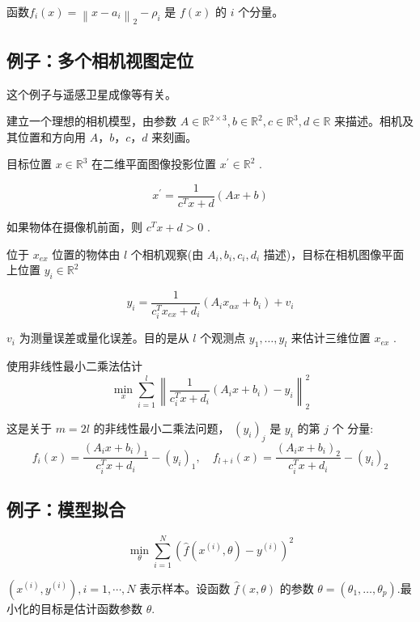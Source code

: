 函数$ f_{i}(x)=\left\|x-a_{i}\right\|_{2}-\rho_{i} $ 是 $ f(x) $ 的 $ i $ 个分量。


\subsection{例子：多个相机视图定位}

\begin{remark}
    这个例子与遥感卫星成像等有关。
\end{remark}

建立一个理想的相机模型，由参数 $ A \in \mathbb{R}^{2 \times 3}, b \in \mathbb{R}^{2}, c \in \mathbb{R}^{3}, d \in \mathbb{R} $ 来描述。相机及其位置和方向用 $ A ， b ， c ， d $ 来刻画。

目标位置 $ x \in \mathbb{R}^{3} $ 在二维平面图像投影位置 $ x^{\prime} \in \mathbb{R}^{2} $ .

$$
x^{\prime}=\frac{1}{c^{T} x+d}(A x+b)
$$

如果物体在摄像机前面，则 $ c^{T} x+d>0 $ .

\begin{problem}
    位于 $ x_{e x} $ 位置的物体由 $ l $ 个相机观察(由 $ A_{i}, b_{i}, c_{i}, d_{i} $ 描述)，目标在相机图像平面上位置 $ y_{i} \in \mathbb{R}^{2} $

    $$
    y_{i}=\frac{1}{c_{i}^{T} x_{e x}+d_{i}}\left(A_{i} x_{\alpha x}+b_{i}\right)+v_{i}
    $$

    $ v_{i} $ 为测量误差或量化误差。目的是从 $ l $ 个观测点 $ y_{1}, \ldots, y_{l} $ 来估计三维位置 $ x_{e x} $ .
\end{problem}


使用非线性最小二乘法估计
$$
\min _{x} \sum_{i=1}^{l}\left\|\frac{1}{c_{i}^{T} x+d_{i}}\left(A_{i} x+b_{i}\right)-y_{i}\right\|_{2}^{2}
$$

这是关于 $ m=2 l $ 的非线性最小二乘法问题， $ \left(y_{i}\right)_{j} $ 是 $ y_{i} $ 的第 $ j $ 个 分量:
$$
f_{i}(x)=\frac{\left(A_{i} x+b_{i}\right)_{1}}{c_{i}^{T} x+d_{i}}-\left(y_{i}\right)_{1}, \quad f_{l+i}(x)=\frac{\left(A_{i} x+b_{i}\right)_{2}}{c_{i}^{T} x+d_{i}}-\left(y_{i}\right)_{2}
$$

\subsection{例子：模型拟合}

\begin{problem}
$$
\min _{\theta} \sum_{i=1}^{N}\left(\hat{f}\left(x^{(i)}, \theta\right)-y^{(i)}\right)^{2}
$$

$ \left(x^{(i)}, y^{(i)}\right), i=1, \cdots, N $ 表示样本。设函数 $ \hat{f}(x, \theta) $ 的参数 $ \theta = \left(\theta_{1}, \ldots, \theta_{p}\right) $.最小化的目标是估计函数参数 $ \theta $.
\end{problem}

